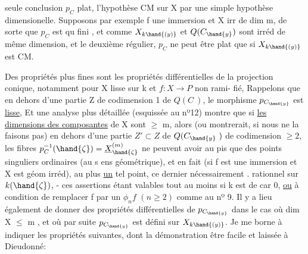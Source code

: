 seule conclusion $p_C$ plat, l'hypothèse CM sur X par une simple hypothèse
dimensionelle. Supposons par exemple f une immersion et X irr de dim m,
de sorte que $p_C$ est qu fini , et comme $X_{k\hand{(y)}}$ et $Q(C_{\hand{y}})$ sont irréd de
même dimension,  et le deuxième régulier, $p_C$ ne peut être
plat que si $X_{k\hand{(y)}}$ est CM.

Des propriétés plus fines sont les propriétés différentielles de
la projection conique, notamment pour X lisse sur k et $f:X\longrightarrow P$ non rami-%
fié,  Rappelons que 
en dehors d'une partie Z de codimension 1 de $Q(C\ )$, le morphisme
$p_{C_{\hand{y}}}$  est \uline{lisse}, Et une analyse plus détaillée (esquissée au nº12) montre
que si \uline{les dimensions des composantes} de X sont $\geq$ m, alors\hand{)}
(ou montrerait, si nous ne la faisons pas)  en dehors d'une partie $Z'\subset Z$
de $Q(C_{\hand{y}}\ )$ de codimension $\geq 2$, les fibres $p_C^{-1}(\hand{\zeta}) = \underline{X}^{(m)}_{\hand{\zeta}}$ ne peuvent
avoir au pis que des points  singuliers ordinaires (au s ens
géométrique), et en fait (si f est une immersion et X est géom irréd),
 au plus \uline{un} tel point, ce dernier   nécessairement  .
rationnel sur $k(\hand{\zeta})$, - ces assertions étant valables tout au moins si
k est de car 0, \uline{ou} à condition de remplacer f par un $\phi_n f$ $(n\geq 2)$ comme
au nº 9. Il y a lieu également de donner des propriétés différentielles
de $p_{C_{\hand{y}}}$ dans le cas où dim X $\leqslant$ m , et où par suite $p_{C_{\hand{y}}}$ est défini sur $X_{k\hand{(y)}}$.
Je me borne à indiquer les propriétés suivantes, dont la démonstration
 être facile et  laissée à Dieudonné:


